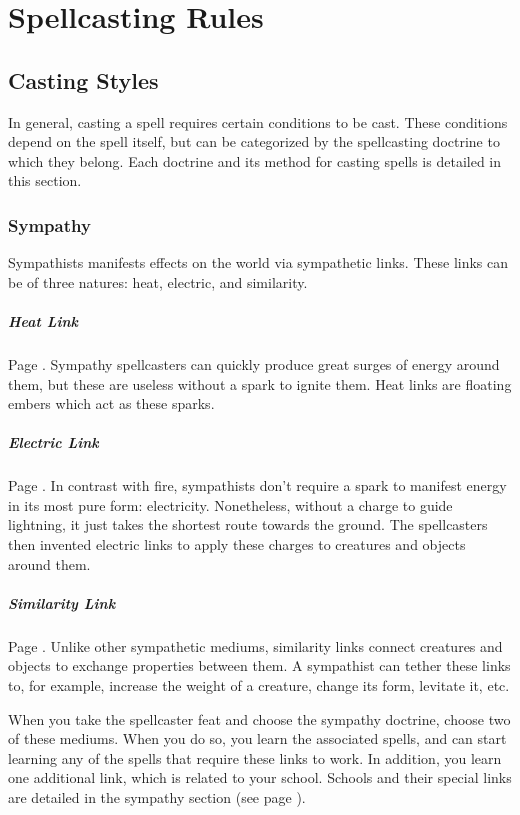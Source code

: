 \section{Spellcasting Rules} \label{sec::spellcastingrules}
\subsection*{Casting Styles}
    In general, casting a spell requires certain conditions to be cast.
    These conditions depend on the spell itself, but can be categorized by the spellcasting doctrine to which they belong.
    Each doctrine and its method for casting spells is detailed in this section.

    \subsubsection{Sympathy}
    Sympathists manifests effects on the world via sympathetic links.
    These links can be of three natures: heat, electric, and similarity.

    \subparagraph{Heat Link}
    Page \pageref{spell::ember}.
    Sympathy spellcasters can quickly produce great surges of energy around them, but these are useless without a spark to ignite them.
    Heat links are floating embers which act as these sparks.

    \subparagraph{Electric Link}
    Page \pageref{spell::charge}.
    In contrast with fire, sympathists don't require a spark to manifest energy in its most pure form: electricity.
    Nonetheless, without a charge to guide lightning, it just takes the shortest route towards the ground.
    The spellcasters then invented electric links to apply these charges to creatures and objects around them.

    \subparagraph{Similarity Link}
    Page \pageref{spell::tether}.
    Unlike other sympathetic mediums, similarity links connect creatures and objects to exchange properties between them.
    A sympathist can tether these links to, for example, increase the weight of a creature, change its form, levitate it, etc.

    When you take the spellcaster feat and choose the sympathy doctrine, choose two of these mediums.
    When you do so, you learn the associated spells, and can start learning any of the spells that require these links to work.
    In addition, you learn one additional link, which is related to your school.
    Schools and their special links are detailed in the sympathy section (see page \pageref{sec::sympathy}).


